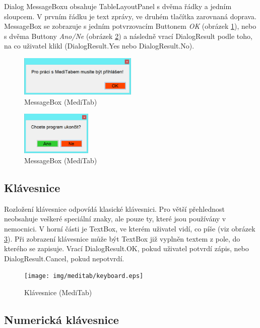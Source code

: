 Dialog MessageBoxu obsahuje TableLayoutPanel s dvěma řádky a jedním sloupcem. V prvním řádku je text zprávy, ve druhém tlačítka zarovnaná doprava. MessageBox se zobrazuje s jedním potvrzovacím Buttonem \emph{OK} (obrázek \ref{fig:bmb1}), nebo s dvěma Buttony \emph{Ano/Ne} (obrázek \ref{fig:bmb2}) a následně vrací DialogResult podle toho, na co uživatel klikl (DialogResult.Yes nebo DialogResult.No).

\begin{figure}[H]
	\centering
	\includegraphics[width=0.5\textwidth]{img/meditab/bmb1.eps}
	\caption{MessageBox (MediTab)}
  \label{fig:bmb1}
\end{figure}

\begin{figure}[H]
	\centering
	\includegraphics[width=0.3\textwidth]{img/meditab/bmb2.eps}
	\caption{MessageBox (MediTab)}
  \label{fig:bmb2}
\end{figure}

\subsection{Klávesnice}

Rozložení klávesnice odpovídá klasické klávesnici. Pro větší přehlednost neobsahuje veškeré speciální znaky, ale pouze ty, které jsou používány v nemocnici. V horní části je TextBox, ve kterém uživatel vidí, co píše (viz obrázek \ref{fig:keyboard}). Při zobrazení klávesnice může být TextBox již vyplněn textem z pole, do kterého se zapisuje. Vrací DialogResult.OK, pokud uživatel potvrdí zápis, nebo DialogResult.Cancel, pokud nepotvrdí.

\begin{figure}[H]
	\centering
	\texttt{[image: img/meditab/keyboard.eps]}
	\caption{Klávesnice (MediTab)}
  \label{fig:keyboard}
\end{figure}

\subsection{Numerická klávesnice}

